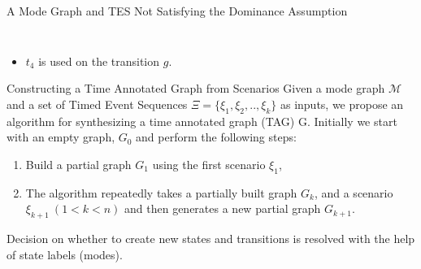 \documentclass[10pt]{beamer}
\theoremstyle{plain}
\theoremstyle{definition}
\begin{document}
\begin{frame}{A Mode Graph and TES Not Satisfying the Dominance Assumption}
\begin{columns}
\begin{column}{0.5\textwidth}
\begin{figure}
\begin{adjustbox}{max totalsize={.80\textwidth}{.80\textheight},center}
				\end{adjustbox}
			\end{figure} 
		\end{column}
	\end{columns}
	\begin{itemize}
		\item $t_4$ is used on the transition $g$.
	\end{itemize}
\end{frame}

\begin{frame}{Constructing a Time Annotated Graph from Scenarios}
	Given a mode graph $\mathcal{M}$ and a set of Timed Event Sequences  $\Xi = \{\xi_1,\xi_2,..,\xi_k\}$ as inputs, we propose an algorithm for synthesizing a time annotated graph (TAG) G. Initially we start with an empty graph, $G_0$ and perform the following steps:
	\begin{enumerate}
		\item Build a partial graph $G_1$ using the first scenario $\xi_1$,
		\item The algorithm repeatedly takes a partially built graph $G_k$, and a scenario $\xi_{k+1} ~(1 < k < n)$ and then generates a new partial graph $G_{k+1}$.
	\end{enumerate}
	Decision on whether to create new states and transitions is resolved with the help of state labels (modes).
\end{frame}
\end{document}
